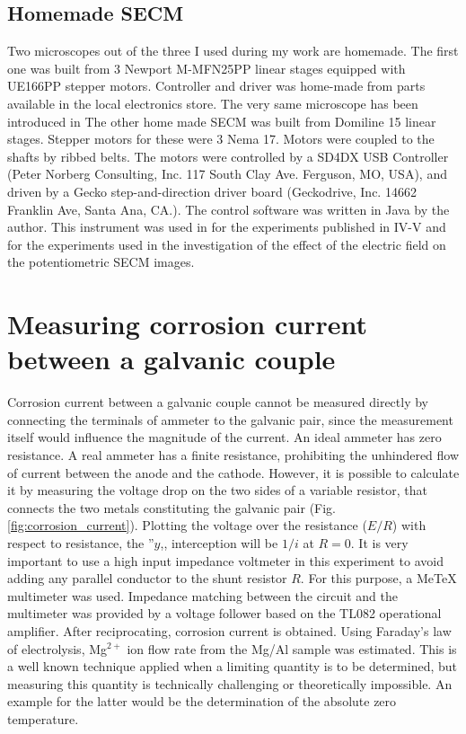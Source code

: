 		\subsection{Homemade SECM}
Two microscopes out of the three I used during my work are homemade.
The first one was built from 3 Newport M-MFN25PP linear stages equipped with UE166PP stepper motors. 
Controller and driver was home-made from parts available in the local electronics store.
The very same microscope has been introduced in \cite{kovacs1999automatic}
The other home made SECM was built from Domiline 15 linear stages.
Stepper motors for these were 3 Nema 17.
Motors were coupled to the shafts by ribbed belts.
The motors were controlled by a SD4DX USB Controller (Peter Norberg Consulting, Inc. 117 South Clay Ave. Ferguson, MO, USA), and driven by a Gecko step-and-direction driver board (Geckodrive, Inc. 14662 Franklin Ave, Santa Ana, CA.).
The control software was written in Java by the author. 
This instrument was used in for the experiments published in IV-V and for the experiments used in the investigation of the effect of the electric field on the potentiometric SECM images.
	\section{Measuring corrosion current between a galvanic couple}
Corrosion current between a galvanic couple cannot be measured directly by connecting the terminals of ammeter to the galvanic pair, since the measurement itself would influence the magnitude of the current.
An ideal ammeter has zero resistance.
A real ammeter has a finite resistance, prohibiting the unhindered flow of current between the anode and the cathode.
However, it is possible to calculate it by measuring the voltage drop on the two sides of a variable resistor, that connects the two metals constituting the galvanic pair (Fig. \ref{fig:corrosion_current}).
Plotting the voltage over the resistance ($E/R$) with respect to resistance, the ''$y$,, interception will be $1/i$ at $R=0$.
It is very important to use a high input impedance voltmeter in this experiment to avoid adding any parallel conductor to the shunt resistor $R$.
For this purpose, a MeTeX multimeter was used.
Impedance matching between the circuit and the multimeter was provided by a voltage follower based on the TL082 operational amplifier.
After reciprocating, corrosion current is obtained.
Using Faraday's law of electrolysis, Mg$^{2+}$ ion flow rate from the Mg/Al sample was estimated.
This is a well known technique applied when a limiting quantity is to be determined, but measuring this quantity is technically challenging or theoretically impossible.
An example for the latter would be the determination of the absolute zero temperature.

